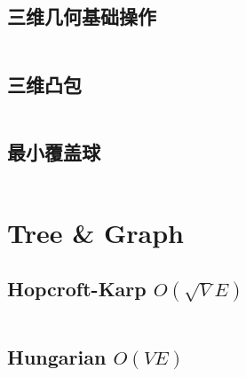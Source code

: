 \documentclass[titlepage, a4paper]{article}
\newcommand\nothing{}
\renewcommand{\checkmark}[0]{\nothing}
\begin{document}
\begin{multicols}{2}
\begin{spacing}{0.6}
				\subsection{三维几何基础操作\checkmark}
				\inputminted{cpp}{src/Geometry/三维几何.cpp}
				\subsection{三维凸包\checkmark}
				\inputminted{cpp}{src/Geometry/三维凸包.cpp}
				\subsection{最小覆盖球}
				\inputminted{cpp}{src/Geometry/最小覆盖球.cpp}
				\newpage
				
			
				
			\section{Tree \& Graph}
				\subsection{Hopcroft-Karp $O(\sqrt{V} E)$\checkmark}
				\inputminted{cpp}{src/TreeandGraph/Hopcroft.cpp}
				\subsection{Hungarian $O(V E)$\checkmark}
				\inputminted{cpp}{src/TreeandGraph/Hungarian.cpp}

\end{spacing}
\end{multicols}
\end{document}

